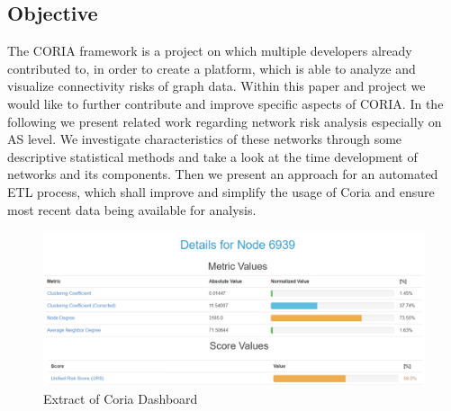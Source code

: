 \documentclass[conference]{IEEEtran}
\begin{document}
\subsection{Objective}
The CORIA framework is a project on which multiple developers already contributed to, in order to create a platform, which is able to analyze and visualize connectivity risks of graph data. Within this paper and project we would like to further contribute and improve specific aspects of CORIA. In the following we present related work regarding network risk analysis especially on AS level. We investigate characteristics of these networks through some descriptive statistical methods and take a look at the time development of networks and its components. Then we present an approach for an automated ETL process, which shall improve and simplify the usage of Coria and ensure most recent data being available for analysis. \\





\begin{figure}[htbp]
\centerline{\includegraphics[scale=0.4]{Graphics/coriaExtract.PNG}}
\caption{Extract of Coria Dashboard}
\label{fig}
\end{figure}
\end{document}
